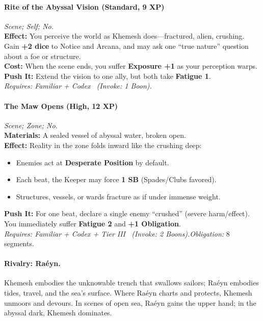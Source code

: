 \paragraph{Rite of the Abyssal Vision (Standard, 9 XP)} \emph{Scene; Self; No.}\\
\textbf{Effect:} You perceive the world as Khemesh does—fractured, alien, crushing. Gain \textbf{+2 dice} to Notice and Arcana, and may ask one “true nature” question about a foe or structure.\\
\textbf{Cost:} When the scene ends, you suffer \textbf{Exposure +1} as your perception warps.\\
\textbf{Push It:} Extend the vision to one ally, but both take \textbf{Fatigue 1}.\\
\emph{Requires: Familiar + Codex \ (\textit{Invoke:} 1 Boon).}

\paragraph{The Maw Opens (High, 12 XP)} \emph{Scene; Zone; No.}\\
\textbf{Materials:} A sealed vessel of abyssal water, broken open.\\
\textbf{Effect:} Reality in the zone folds inward like the crushing deep: \\
\begin{itemize}
  \item Enemies act at \textbf{Desperate Position} by default.  
  \item Each beat, the Keeper may force \textbf{1 SB} (Spades/Clubs favored).  
  \item Structures, vessels, or wards fracture as if under immense weight.  
\end{itemize}
\textbf{Push It:} For one beat, declare a single enemy “crushed” (severe harm/effect). You immediately suffer \textbf{Fatigue 2} and \textbf{+1 Obligation}.\\
\emph{Requires: Familiar + Codex + Tier III \ (\textit{Invoke:} 2 Boons).}\quad \emph{Obligation:} 8 segments.

\paragraph{Rivalry: Raéyn.} Khemesh embodies the unknowable trench that swallows sailors; Raéyn embodies tides, travel, and the sea’s surface. Where Raéyn charts and protects, Khemesh unmoors and devours. In scenes of open sea, Raéyn gains the upper hand; in the abyssal dark, Khemesh dominates.
